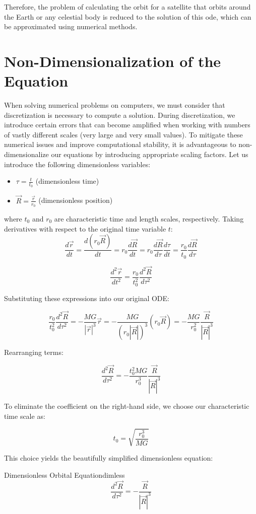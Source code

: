 \documentclass[12pt]{article}
\begin{document}
Therefore, the problem of calculating the orbit for a satellite that orbits around the Earth or any celestial body is reduced to the solution of this \gls{ode}, which can be approximated using numerical methods.

\section{Non-Dimensionalization of the Equation}
When solving numerical problems on computers, we must consider that discretization is necessary to compute a solution. During discretization, we introduce certain errors that can become amplified when working with numbers of vastly different scales (very large and very small values). To mitigate these numerical issues and improve computational stability, it is advantageous to non-dimensionalize our equations by introducing appropriate scaling factors.
Let us introduce the following dimensionless variables:
\begin{itemize}
\item $\tau = \frac{t}{t_0}$ (dimensionless time)
\item $\vec{R} = \frac{\vec{r}}{r_0}$ (dimensionless position)
\end{itemize}
where $t_0$ and $r_0$ are characteristic time and length scales, respectively.
Taking derivatives with respect to the original time variable $t$:
\[
\frac{d\vec{r}}{dt} = \frac{d(r_0\vec{R})}{dt} = r_0\frac{d\vec{R}}{dt} = r_0\frac{d\vec{R}}{d\tau}\frac{d\tau}{dt} = \frac{r_0}{t_0}\frac{d\vec{R}}{d\tau}
\]

\[
\frac{d^2\vec{r}}{dt^2} = \frac{r_0}{t_0^2}\frac{d^2\vec{R}}{d\tau^2}
\]

Substituting these expressions into our original ODE:

\[
\frac{r_0}{t_0^2}\frac{d^2\vec{R}}{d\tau^2} = -\frac{MG}{|\vec{r}|^3}\vec{r} = -\frac{MG}{(r_0|\vec{R}|)^3}(r_0\vec{R}) = -\frac{MG}{r_0^2}\frac{\vec{R}}{|\vec{R}|^3}
\]

Rearranging terms:

\[
\frac{d^2\vec{R}}{d\tau^2} = -\frac{t_0^2MG}{r_0^3}\frac{\vec{R}}{|\vec{R}|^3}
\]

To eliminate the coefficient on the right-hand side, we choose our characteristic time scale as:

\[
t_0 = \sqrt{\frac{r_0^3}{MG}}
\]

This choice yields the beautifully simplified dimensionless equation:

\begin{equation_maths}{Dimensionless Orbital Equation}{dimless}
    {\large
    \[
    \frac{d^2\vec{R}}{d\tau^2} = -\frac{\vec{R}}{|\vec{R}|^3}
    \]
    }
\end{equation_maths}
\end{document}
